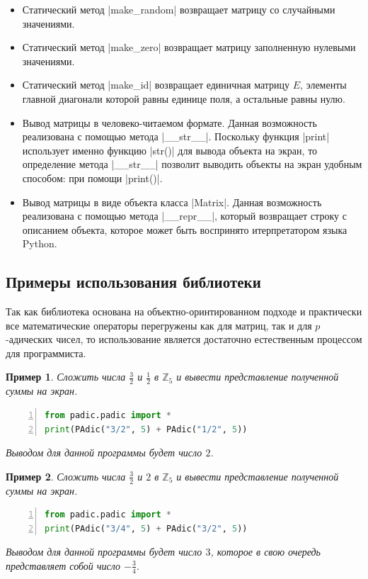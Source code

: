 \documentclass[master, och, diploma, times]{sty/SCWorks}
\theoremstyle{plain}
\newtheorem{exmp}{Пример}[section]
\theoremstyle{definition}
\begin{document}
\begin{itemize}
\item Статический метод |make_random| возвращает матрицу со случайными значениями.
\item Статический метод |make_zero| возвращает матрицу заполненную нулевыми значениями.
\item Статический метод |make_id| возвращает единичная матрицу $E$, элементы главной диагонали которой равны единице поля, а остальные равны нулю.
\item Вывод матрицы в человеко-читаемом формате. Данная возможность реализована с помощью метода |__str__|. Поскольку функция |print| использует именно функцию |str()| для вывода объекта на экран, то определение метода |__str__| позволит выводить объекты на экран удобным способом: при помощи |print()|.
\item Вывод матрицы в виде объекта класса |Matrix|. Данная возможность реализована с помощью метода |__repr__|, который возвращает строку с описанием объекта, которое может быть воспринято итерпретатором языка Python.

	
\end{itemize}



\subsection{Примеры использования библиотеки}

Так как библиотека основана на объектно-оринтированном подходе и практически все математические операторы перегружены как для матриц, так и для $p$-адических чисел, то использование является достаточно естественным процессом для программиста.


\begin{exmp}
Сложить числа $\frac{3}{2}$ и $\frac{1}{2}$ в $\mathbb{Z}_5$ и вывести представление полученной суммы на экран.
\begin{lstlisting}[language=Python, numbers=left, showstringspaces=false, breaklines=true, basicstyle=\small]
from padic.padic import *
print(PAdic("3/2", 5) + PAdic("1/2", 5))
\end{lstlisting}

\noindent Выводом для данной программы будет число $2$.
\end{exmp}


\begin{exmp}
Сложить числа $\frac{3}{2}$ и $2$ в $\mathbb{Z}_5$ и вывести представление полученной суммы на экран.
\begin{lstlisting}[language=Python, numbers=left, showstringspaces=false, breaklines=true, basicstyle=\small]
from padic.padic import *
print(PAdic("3/4", 5) + PAdic("3/2", 5))
\end{lstlisting}

\noindent Выводом для данной программы будет число $3$, которое в свою очередь представляет собой число $-\frac{3}{4}$.
\end{exmp}
\end{document}
